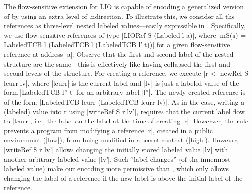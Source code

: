The flow-sensitive extension for LIO is capable of encoding a generalized version
of {\nsu} by using an extra level of indirection.  To illustrate this, we
consider all the references as three-level nested labeled
values---easily expressible in \liofs{}.
Specifically, we use flow-sensitive references of
type |LIORef S (Labeled l a)|, where |mS(a) = LabeledTCB l (LabeledTCB l
(LabeledTCB l' t))| for a given flow-sensitive reference at address |a|. Observe
that the first and second label of the nested structure are the same---this is
effectively like having collapsed the first and second levels of the structure. For
creating a reference, we execute |r <- newRef S lcurr lv|, where |lcurr| is the
current label and |lv| is just a labeled value of the form |LabeledTCB l'' t|
for an arbitrary label |l''|.  The newly created reference is of the form
|LabeledTCB lcurr (LabeledTCB lcurr lv)|.  As in the {\nsu} case, writing a (labeled)
value into r using |writeRef S r lv'|, requires that the current label
flow to |lcurr|, i.e., the label on the label at the time of creating
|r|. Howerver, the {\nsu} rule
prevents a program from modifying a reference |r|, created in a public
environment (|low|), from being modified in a secret context
(|high|). However,
|writeRef S r lv'| allows changing the initially stored labeled value
|lv| with another arbitrary-labeled value |lv'|. Such ``label changes'' (of
the innermost labeled value) make our encoding more permissive than
{\nsu}, which only allows
changing the label of a reference if the new label is 
above the initial label of the reference.


